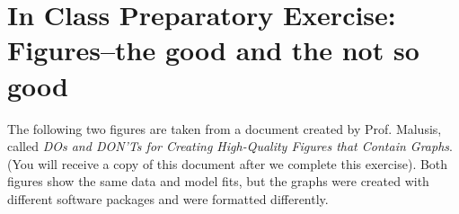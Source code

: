 \documentclass[12pt,letterpaper]{article}
\begin{document}
\section *{In Class Preparatory Exercise: Figures--the good and the not so good}
The following two figures are taken from a document created by Prof. Malusis, called \emph{DOs and DON’Ts for Creating High-Quality Figures that Contain Graphs}.   (You will receive a copy of this document after we complete this exercise).  Both figures show the same data and model fits, but the graphs were created with different software packages and were formatted differently.\\  

%


%  
\end{document}
